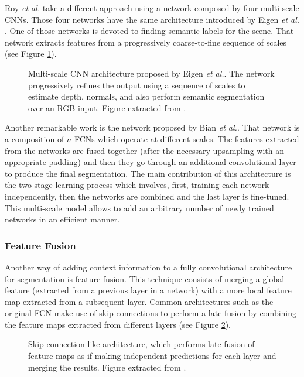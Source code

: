 Roy \emph{et al.}\cite{Roy2016} take a different approach using a network composed by four multi-scale \acp{CNN}. Those four networks have the same architecture introduced by Eigen \emph{et al.} \cite{Eigen2015}. One of those networks is devoted to finding semantic labels for the scene. That network extracts features from a progressively coarse-to-fine sequence of scales (see Figure \ref{fig:eigen-multiscale}).

\begin{figure}[!htb]
	\centering
	\caption{Multi-scale \acs{CNN} architecture proposed by Eigen \emph{et al.}\cite{Eigen2015}. The network progressively refines the output using a sequence of scales to estimate depth, normals, and also perform semantic segmentation over an \acs{RGB} input. Figure extracted from \cite{Eigen2015}.}
	\label{fig:eigen-multiscale}
\end{figure}

Another remarkable work is the network proposed by Bian \emph{et al.}\cite{Bian2016}. That network is a composition of $n$ \acp{FCN} which operate at different scales. The features extracted from the networks are fused together (after the necessary upsampling with an appropriate padding) and then they go through an additional convolutional layer to produce the final segmentation. The main contribution of this architecture is the two-stage learning process which involves, first, training each network independently, then the networks are combined and the last layer is fine-tuned. This multi-scale model allows to add an arbitrary number of newly trained networks in an efficient manner.

\subsubsection{Feature Fusion}

Another way of adding context information to a fully convolutional architecture for segmentation is feature fusion. This technique consists of merging a global feature (extracted from a previous layer in a network) with a more local feature map extracted from a subsequent layer. Common architectures such as the original \acs{FCN} make use of skip connections to perform a late fusion by combining the feature maps extracted from different layers (see Figure \ref{fig:skipconnections}).

\begin{figure}[!hbt]
	\centering
	\caption{Skip-connection-like architecture, which performs late fusion of feature maps as if making independent predictions for each layer and merging the results. Figure extracted from \cite{Pinheiro2016}.}
	\label{fig:skipconnections}
\end{figure}

